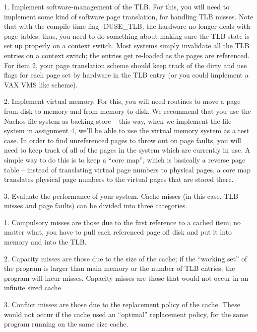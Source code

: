 \begin{description}
\item{1.} Implement software-management of the TLB.  For this, you
will need to implement some kind of software page translation, for handling
TLB misses.  Note that with the compile time flag -DUSE\_TLB, the hardware
no longer deals with page tables; thus, you need to do something about
making sure the TLB state is set up properly on a context switch.
Most systems simply
invalidate all the TLB entries on a context switch; the entries get re-loaded
as the pages are referenced.  For item 2, your page translation scheme
should keep track of the dirty and use flags for each page set by hardware
in the TLB entry (or you could implement a VAX VMS like scheme).

\item{2.}
Implement virtual memory.  For this, you will need routines
to move a page from disk to memory and from memory to disk.
We recommend that you use the Nachos file system as backing store --
this way, when we implement the file system in assignment 4,
we'll be able to use the virtual memory system as a test case.
In order to find unreferenced pages to throw out on page faults, you will need
to keep track of all of the pages in the system which are currently
in use.  A simple way to do this is to keep a ``core map'', which
is basically a reverse page table -- instead of translating virtual
page numbers to physical pages, a core map translates physical page numbers
to the virtual pages that are stored there.

\item{3.} Evaluate the performance of your system.
Cache misses (in this case, TLB misses and page faults) can be divided
into three categories.

\begin{description}
\item{1.} Compulsory misses are those due to the first
reference to a cached item; no matter what, you have to pull each referenced
page off disk and put it into memory and into the TLB.

\item{2.} Capacity misses are those due to the size of the cache;
if the ``working set'' of the program is larger than main memory or
the number of TLB entries, the program will incur misses.
Capacity misses are those that would not occur in an infinite sized cache.

\item{3.} Conflict misses are those due to the replacement policy
of the cache.  These would not occur if the cache used an ``optimal''
replacement policy, for the same program running on the same size cache.
\end{description}


\end{description}

